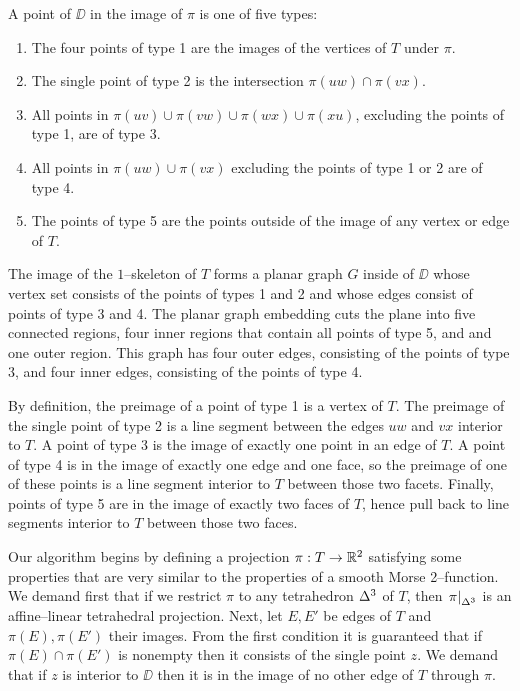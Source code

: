 \begin{defn}
\label{def:projpttypes}
A point of $\DD$ in the image of $\pi$ is one of five types:
\begin{enumerate}
  \item The four points of type 1 are the images of the vertices of $T$ under $\pi$.
  \item The single point of type 2 is the intersection $\pi(uw)\cap\pi(vx)$.
  \item All points in $\pi(uv)\cup\pi(vw)\cup\pi(wx)\cup\pi(xu)$, excluding the points of type 1, are of type 3.
  \item All points in $\pi(uw)\cup\pi(vx)$ excluding the points of type 1 or 2 are of type 4.
  \item The points of type 5 are the points outside of the image of any vertex or edge of $T$.
\end{enumerate}
The image of the $1$--skeleton of $T$ forms a planar graph $G$ inside of $\DD$ whose vertex set consists of the points of types 1 and 2 and whose edges consist of points of type 3 and 4.
The planar graph embedding cuts the plane into five connected regions, four inner regions that contain all points of type 5, and and one outer region.
This graph has four outer edges, consisting of the points of type 3, and four inner edges, consisting of the points of type 4.

By definition, the preimage of a point of type 1 is a vertex of $T$.
The preimage of the single point of type 2 is a line segment between the edges $uw$ and $vx$ interior to $T$.
A point of type 3 is the image of exactly one point in an edge of $T$.
A point of type 4 is in the image of exactly one edge and one face, so the preimage of one of these points is a line segment interior to $T$ between those two facets.
Finally, points of type 5 are in the image of exactly two faces of $T$, hence pull back to line segments interior to $T$ between those two faces.
\end{defn}

Our algorithm begins by defining a projection $\pi:T\to\mathbb{R}^2$ satisfying some properties that are very similar to the properties of a smooth Morse 2--function.
We demand first that if we restrict $\pi$ to any tetrahedron $\Delta^3$ of $T$, then $\left.\pi\right|_{\Delta^3}$ is an affine--linear tetrahedral projection.
Next, let $E,E'$ be edges of $T$ and $\pi(E),\pi(E')$ their images.
From the first condition it is guaranteed that if $\pi(E)\cap\pi(E')$ is nonempty then it consists of the single point $z$.
We demand that if $z$ is interior to $\DD$ then it is in the image of no other edge of $T$ through $\pi$.

